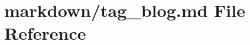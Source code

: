 \hypertarget{tag__blog_8md}{}\section{markdown/tag\+\_\+blog.md File Reference}
\label{tag__blog_8md}
